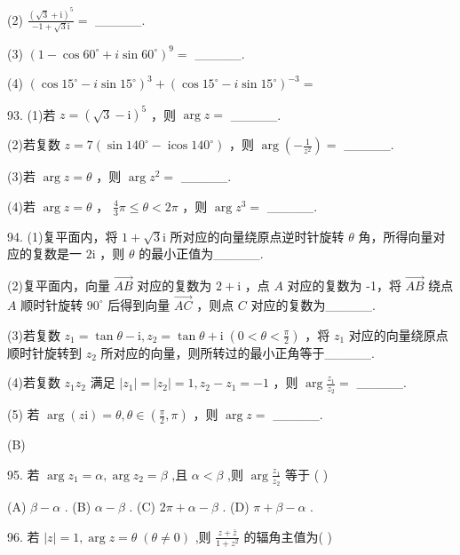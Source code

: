 \documentclass[10pt]{article}
\begin{document}
(2) \(\frac{{\left( \sqrt{3} + \mathrm{i}\right) }^{5}}{-1 + \sqrt{3}\mathrm{i}} =\) \_\_\_\_\_.

(3) \({\left( 1 - \cos {60}^{ \circ  } + i\sin {60}^{ \circ  }\right) }^{9} =\) \_\_\_\_\_.

(4) \({\left( \cos {15}^{ \circ  } - i\sin {15}^{ \circ  }\right) }^{3} + {\left( \cos {15}^{ \circ  } - i\sin {15}^{ \circ  }\right) }^{-3} =\)

93. (1)若 \(z = {\left( \sqrt{3} - \mathrm{i}\right) }^{5}\) ，则 \(\arg z =\) \_\_\_\_\_.

(2)若复数 \(z = 7\left( {\sin {140}^{ \circ  } - \operatorname{icos}{140}^{ \circ  }}\right)\) ，则 \(\arg \left( {-\frac{1}{{z}^{2}}}\right)  =\) \_\_\_\_\_.

(3)若 \(\arg z = \theta\) ，则 \(\arg {z}^{2} =\) \_\_\_\_\_.

(4)若 \(\arg z = \theta\) ， \(\frac{4}{3}\pi  \leq  \theta  < {2\pi }\) ，则 \(\arg {z}^{3} =\) \_\_\_\_\_.

94. (1)复平面内，将 \(1 + \sqrt{3}\mathrm{i}\) 所对应的向量绕原点逆时针旋转 \(\theta\) 角，所得向量对应的复数是一 \(2\mathrm{i}\) ，则 \(\theta\) 的最小正值为\_\_\_\_\_.

(2)复平面内，向量 \(\overrightarrow{AB}\) 对应的复数为 \(2 + \mathrm{i}\) ，点 \(A\) 对应的复数为 -1，将 \(\overrightarrow{AB}\) 绕点 \(A\) 顺时针旋转 \({90}^{ \circ  }\) 后得到向量 \(\overrightarrow{AC}\) ，则点 \(C\) 对应的复数为\_\_\_\_\_.

(3)若复数 \({z}_{1} = \tan \theta  - \mathrm{i},{z}_{2} = \tan \theta  + \mathrm{i}\;\left( {0 < \theta  < \frac{\pi }{2}}\right)\) ，将 \({z}_{1}\) 对应的向量绕原点顺时针旋转到 \({z}_{2}\) 所对应的向量，则所转过的最小正角等于\_\_\_\_\_.

(4)若复数 \({z}_{1}{z}_{2}\) 满足 \(\left| {z}_{1}\right|  = \left| {z}_{2}\right|  = 1,{z}_{2} - {z}_{1} =  - 1\) ，则 \(\arg \frac{{z}_{1}}{{z}_{2}} =\) \_\_\_\_\_.

(5) 若 \(\arg \left( {z\mathrm{i}}\right)  = \theta ,\theta  \in  \left( {\frac{\pi }{2},\pi }\right)\) ，则 \(\arg z =\) \_\_\_\_\_.

(B)

95. 若 \(\arg {z}_{1} = \alpha ,\arg {z}_{2} = \beta\) ,且 \(\alpha  < \beta\) ,则 \(\arg \frac{{z}_{1}}{{z}_{2}}\) 等于 ( )

(A) \(\beta  - \alpha\) . (B) \(\alpha  - \beta\) . (C) \({2\pi } + \alpha  - \beta\) . (D) \(\pi  + \beta  - \alpha\) .

96. 若 \(\left| z\right|  = 1,\arg z = \theta \;\left( {\theta  \neq  0}\right)\) ,则 \(\frac{z + \bar{z}}{1 + {z}^{2}}\) 的辐角主值为( )
\end{document}
